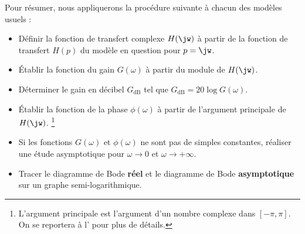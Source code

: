 Pour résumer, nous appliquerons la procédure suivante à chacun des modèles 
usuels :
\begin{itemize}
    \item[i)] Définir la fonction de transfert complexe $H(\jw)$ à partir de la 
          fonction de transfert $H(p)$ du modèle en question pour $p=\jw$.
    \item[ii)] \'Etablir la fonction du gain $G(\omega)$ à partir du 
          module de $H(\jw)$.
    \item[iii)] Déterminer le gain en décibel $G_{\si{\dB}}$ tel que 
        $G_{\si{\dB}}=20\log{G(\omega)}$.
    \item[iv)] \'Etablir la fonction de la phase $\phi(\omega)$ à partir de 
        l'argument principale de $H(\jw)$.
        \footnote{L'argument principale est l'argument d'un nombre complexe 
        dans $[-\pi,\pi]$. On se reportera à l' pour plus 
        de détails.}
    \item[v)] Si les fonctions $G(\omega)$ et $\phi(\omega)$ ne sont pas de 
          simples constantes, réaliser une étude
          asymptotique pour $\omega\rightarrow 0$ et 
          $\omega\rightarrow +\infty$.
    \item[vi)] Tracer le diagramme de Bode \textbf{réel} et le diagramme 
          de Bode \textbf{asymptotique} sur un graphe semi-logarithmique.
\end{itemize}
\newpage
